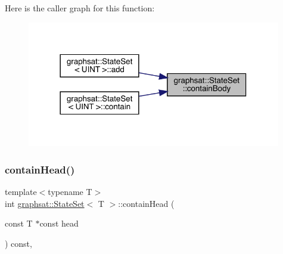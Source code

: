 Here is the caller graph for this function\+:
\nopagebreak
\begin{figure}[H]
\begin{center}
\leavevmode
\includegraphics[width=314pt]{classgraphsat_1_1_state_set_ac83a9a8a89c6976ba650fc6b221c4cf0_icgraph}
\end{center}
\end{figure}
\mbox{\label{classgraphsat_1_1_state_set_ab499cfa88c12fedc5d0b6ae8e60ee1e9}} 
\subsubsection{\texorpdfstring{containHead()}{containHead()}}
{\footnotesize\ttfamily template$<$typename T$>$ \\
int \mbox{\hyperlink{classgraphsat_1_1_state_set}{graphsat\+::\+State\+Set}}$<$ T $>$\+::contain\+Head (\begin{DoxyParamCaption}\item[{const T $\ast$const}]{head }\end{DoxyParamCaption}) const\hspace{0.3cm}{\ttfamily [inline]}, {\ttfamily [private]}}


